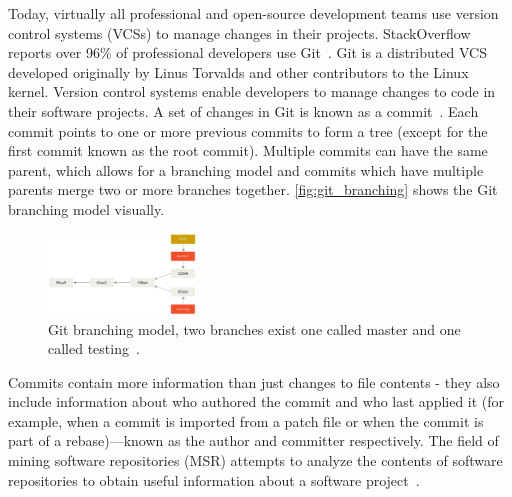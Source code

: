 Today, virtually all professional and open-source development teams use version control systems (VCSs) to manage changes in their projects.
StackOverflow reports over 96\% of professional developers use Git~\cite{vcs_usage}.
Git is a distributed VCS developed originally by Linus Torvalds and other contributors to the Linux kernel.
Version control systems enable developers to manage changes to code in their software projects.
A set of changes in Git is known as a commit~\cite{pro_git}.
Each commit points to one or more previous commits to form a tree (except for the first commit known as the root commit).
Multiple commits can have the same parent, which allows for a branching model and commits which have multiple parents merge two or more branches together.
\autoref{fig:git_branching} shows the Git branching model visually.

\begin{figure}[ht]
	\centering
	\includegraphics[width=0.35\textwidth]{images/git-branching}
	\caption{Git branching model, two branches exist one called master and one called testing~\cite{pro_git}.}
\label{fig:git_branching}
\end{figure}

Commits contain more information than just changes to file contents - they also include information about who authored the commit and who last applied it (for example, when a commit is imported from a patch file or when the commit is part of a rebase)---known as the author and committer respectively.
The field of mining software repositories (MSR) attempts to analyze the contents of software repositories to obtain useful information about a software project~\cite{road_ahead_for_msr}.


